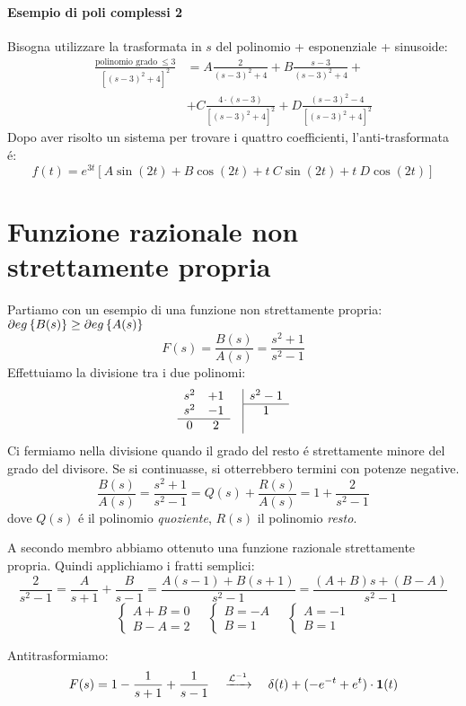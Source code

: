 \documentclass[../main.tex]{subfiles}
\begin{document}
		\begin{mdframed}[style=Esempio]
			\paragraph{Esempio di poli complessi 2}
			Bisogna utilizzare la trasformata in $ s $ del polinomio + esponenziale + sinusoide:
			\begin{align*}
				\frac{\text{polinomio grado}\: \leq 3}{[(s-3)^2 + 4]^2} &= A \frac{2}{(s-3)^2 + 4} + B \frac{s - 3}{(s-3)^2 + 4} +
				\\
				&+ C \frac{4 \cdot (s-3)}{[(s-3)^2 + 4]^2} + D \frac{(s - 3)^2 - 4}{[(s-3)^2 + 4]^2}
			\end{align*}
			Dopo aver risolto un sistema per trovare i quattro coefficienti, l'anti-trasformata \'{e}:
			\[
				f(t) = e^{3t} [A \sin(2t) + B \cos(2t) + t\ C \sin(2t) + t\ D \cos(2t)]
			\]
		\end{mdframed}
	\section{Funzione razionale non strettamente propria}
		\begin{mdframed}[style=Esempio]
			Partiamo con un esempio di una funzione non strettamente propria: $ \partial eg \left\lbrace B(s) \right\rbrace \geq \partial eg \left\lbrace A(s) \right\rbrace $
			\[
				F(s) = \frac{B(s)}{A(s)} = \frac{s^2+1}{s^2-1}
			\]
			Effettuiamo la divisione tra i due polinomi:
			\[ 
				\begin{array}{ccc|c}
					s^2 & +1 & & s^2-1\\ \cline{4-4}
					s^2 & -1 & & 1\\ \cline{1-2}
					0 	& 2  & &
				\end{array}
			\]
			Ci fermiamo nella divisione quando il grado del resto \'e strettamente minore del grado del divisore. Se si continuasse, si otterrebbero termini con potenze negative.
			\[
				\frac{B(s)}{A(s)} = \frac{s^2+1}{s^2-1} = Q(s) + \frac{R(s)}{A(s)} = 1 + \frac{2}{s^2-1}
			\]
			dove $ Q(s) $ \'{e} il polinomio \textit{quoziente}, $ R(s) $ il polinomio \textit{resto}.
			
			A secondo membro abbiamo ottenuto una funzione razionale strettamente propria. Quindi applichiamo i fratti semplici:
			\[
				\frac{2}{s^2-1} = \frac{A}{s+1} + \frac{B}{s-1} = \frac{A(s-1) + B(s+1)}{s^2-1} = \frac{(A+B)s + (B-A)}{s^2-1}
			\]
			\[ 
				\begin{cases}
					A + B = 0\\
					B - A = 2
				\end{cases}\quad
				\begin{cases}
					B = -A\\
					B = 1
				\end{cases}\quad
				\begin{cases}
					A = -1\\
					B = 1
				\end{cases}
			\]
			
			Antitrasformiamo:
			\[
				F(s) = 1 - \frac{1}{s+1} + \frac{1}{s-1} \quad \xrightarrow{\mathcal{L}^{-1}} \quad  \delta(t) + (-e^{-t} + e^t) \cdot \textbf{1}(t)
			\]
		\end{mdframed}
	
\end{document}
